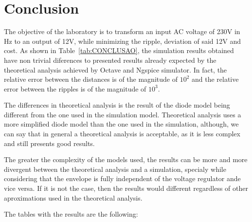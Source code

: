\section{Conclusion}
\label{sec:conclusion}

The objective of the laboratory is to transform an input AC voltage of 230V in Hz to an output of 12V, while minimizing the ripple, deviation of said 12V and cost. As shown in Table~\ref{tab:CONCLUSAO}, the simulation results obtained have non trivial diferences to presented results already expected by the theoretical analysis achieved by Octave and Ngspice simulator. In fact, the relative error between the distances is of the magnitude of $10^2$ and the relative error between the ripples is of the magnitude of $10^3$.

The differences in theoretical analysis is the result of the diode model being different from the one used in the simulation model. Theoretical analysis uses a more simplified diode model than the one used in the simulation, although, we can say that in general a theoretical analysis is acceptable, as it is less complex and still presents good results.

The greater the complexity of the models used, the results can be more and more divergent between the theoretical analysis and a simulation, specialy while considering that the envelope is fully independent of the voltage regulator ande vice versa. If it is not the case, then the results would different regardless of other aproximations used in the theoretical analysis.

The tables with the results are the following:

